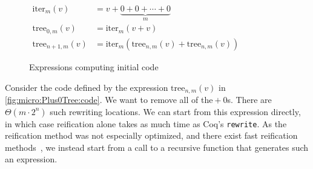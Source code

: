 \begin{figure}
{\small $\begin{aligned}
\text{iter}_m(v) & = v + \underbrace{0 + 0 + \cdots + 0}_m \\
\text{tree}_{0,m}(v) &= \text{iter}_m(v + v) \\
\text{tree}_{n+1,m}(v) &= \text{iter}_m(\text{tree}_{n,m}(v) + \text{tree}_{n,m}(v))
\end{aligned}$}%
\caption{\label{fig:micro:Plus0Tree:code}Expressions computing initial code}
\end{figure}
Consider the code defined by the expression $\text{tree}_{n,m}(v)$ in \autoref{fig:micro:Plus0Tree:code}.
We want to remove all of the${}+0$s.
There are $\Theta(m \cdot 2^n)$ such rewriting locations.
We can start from this expression directly, in which case reification alone takes as much time as Coq's \texttt{rewrite}.
As the reification method was not especially optimized, and there exist fast reification methods~\cite{reification-by-parametricity}, we instead start from a call to a recursive function that generates such an expression.

\egroup

